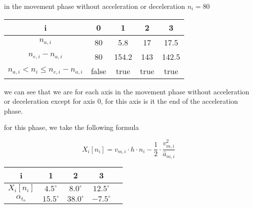 \documentclass[professionalfonts, 
               xcolor={ usenames, %
                        dvipsnames,%
                        svgnames,%
                        table,%
                        hyperref%
                      }
              ]{beamer}
\begin{document}
\begin{frame}
in the movement phase without acceleration or deceleration $n_i = 80$

\begin{center}
\begin{tabular}{ccccc}
\toprule
i & 0 & 1 & 2 & 3 \\
\midrule
$n_{a,i}$ & 80 & 5.8 & 17 & 17.5 \\ 
$ n_{e,i} - n_{a,i}$ & 80 & 154.2 & 143 & 142.5 \\
$ n_{a,i} < n_{i} \leq n_{e,i} - n_{a,i}$ & false & true & true & true \\
\bottomrule
\end{tabular}
\end{center}

we can see that we are for each axis in the movement phase without acceleration or deceleration except for
axis 0, for this axis is it the end of the acceleration phase.

for this phase, we take the following formula

\begin{equation*}
X_{i}[n_{i}] = v_{m,i} \cdot h \cdot n_{i} - \frac{1}{2} \cdot \frac{v_{m,i}^2}{\hat{a}_{m,i}} 
\end{equation*}

\begin{center}
\begin{tabular}{ccccc}
\toprule
i & 1 & 2 & 3 \\
\midrule
$X_{i}[n_{i}]$ & $4.5^\circ$ & $8.0^\circ$ & $12.5^\circ$ \\ 
$\alpha_{t_{n}}$ & $15.5^\circ$ & $38.0^\circ$ & $-7.5^\circ$ \\
\bottomrule
\end{tabular}
\end{center}
\end{frame}
\end{document}
